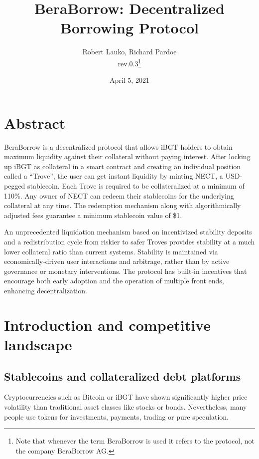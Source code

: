 \documentclass{article}
\begin{document}
\title{\textbf{BeraBorrow: Decentralized Borrowing Protocol}}
\author{Robert Lauko, Richard Pardoe \\ rev.0.3\footnote{Note that whenever the term BeraBorrow is used it refers to the protocol, not the company BeraBorrow AG.}}
\date{April 5, 2021}

\maketitle

\section*{Abstract}
BeraBorrow is a decentralized protocol that allows iBGT holders to obtain maximum liquidity against their collateral without paying interest. After locking up iBGT as collateral in a smart contract and creating an individual position called a “Trove”, the user can get instant liquidity by minting NECT, a USD-pegged stablecoin. Each Trove is required to be collateralized at a minimum of 110\%. Any owner of NECT can redeem their stablecoins for the underlying collateral at any time. The redemption mechanism along with algorithmically adjusted fees guarantee a minimum stablecoin value of \$1. 

An unprecedented liquidation mechanism based on incentivized stability deposits and a redistribution cycle from riskier to safer Troves provides stability at a much lower collateral ratio than current systems. Stability is maintained via economically-driven user interactions and arbitrage, rather than by active governance or monetary interventions. 
The protocol has built-in incentives that encourage both early adoption and the operation of multiple front ends, enhancing decentralization.

\newpage

\tableofcontents

\section{Introduction and competitive landscape}

\subsection{Stablecoins and collateralized debt platforms}
Cryptocurrencies such as Bitcoin or iBGT have shown significantly higher price volatility than traditional asset classes like stocks or bonds. Nevertheless, many people use tokens for investments, payments, trading or pure speculation.
\end{document}
